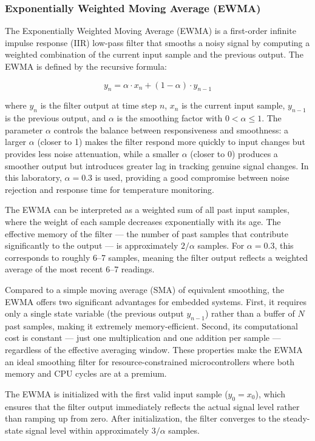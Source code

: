 \subsubsection{Exponentially Weighted Moving Average (EWMA)}

The Exponentially Weighted Moving Average (EWMA) is a first-order infinite impulse response (IIR) low-pass filter that smooths a noisy signal by computing a weighted combination of the current input sample and the previous output. The EWMA is defined by the recursive formula:

$$y_n = \alpha \cdot x_n + (1 - \alpha) \cdot y_{n-1}$$

where $y_n$ is the filter output at time step $n$, $x_n$ is the current input sample, $y_{n-1}$ is the previous output, and $\alpha$ is the smoothing factor with $0 < \alpha \leq 1$. The parameter $\alpha$ controls the balance between responsiveness and smoothness: a larger $\alpha$ (closer to 1) makes the filter respond more quickly to input changes but provides less noise attenuation, while a smaller $\alpha$ (closer to 0) produces a smoother output but introduces greater lag in tracking genuine signal changes. In this laboratory, $\alpha = 0.3$ is used, providing a good compromise between noise rejection and response time for temperature monitoring.

The EWMA can be interpreted as a weighted sum of all past input samples, where the weight of each sample decreases exponentially with its age. The effective memory of the filter --- the number of past samples that contribute significantly to the output --- is approximately $2/\alpha$ samples. For $\alpha = 0.3$, this corresponds to roughly 6--7 samples, meaning the filter output reflects a weighted average of the most recent 6--7 readings.

Compared to a simple moving average (SMA) of equivalent smoothing, the EWMA offers two significant advantages for embedded systems. First, it requires only a single state variable (the previous output $y_{n-1}$) rather than a buffer of $N$ past samples, making it extremely memory-efficient. Second, its computational cost is constant --- just one multiplication and one addition per sample --- regardless of the effective averaging window. These properties make the EWMA an ideal smoothing filter for resource-constrained microcontrollers where both memory and CPU cycles are at a premium.

The EWMA is initialized with the first valid input sample ($y_0 = x_0$), which ensures that the filter output immediately reflects the actual signal level rather than ramping up from zero. After initialization, the filter converges to the steady-state signal level within approximately $3/\alpha$ samples.

